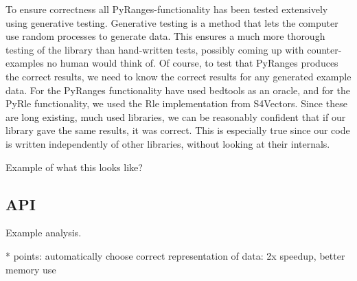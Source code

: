 \documentclass[10pt,letterpaper]{article}
\begin{document}
To ensure correctness all PyRanges-functionality has been tested extensively
using generative testing. Generative testing is a method that lets the computer
use random processes to generate data. This ensures a much more thorough testing
of the library than hand-written tests, possibly coming up with counter-examples
no human would think of. Of course, to test that PyRanges produces the correct
results, we need to know the correct results for any generated example data. For
the PyRanges functionality have used bedtools as an oracle, and for the PyRle
functionality, we used the Rle implementation from S4Vectors. Since these are
long existing, much used libraries, we can be reasonably confident that if our
library gave the same results, it was correct. This is especially true since our
code is written independently of other libraries, without looking at their
internals.

Example of what this looks like?

\subsection{API}

Example analysis.

* points: automatically choose correct representation of data: 2x speedup,
better memory use




\end{document}
